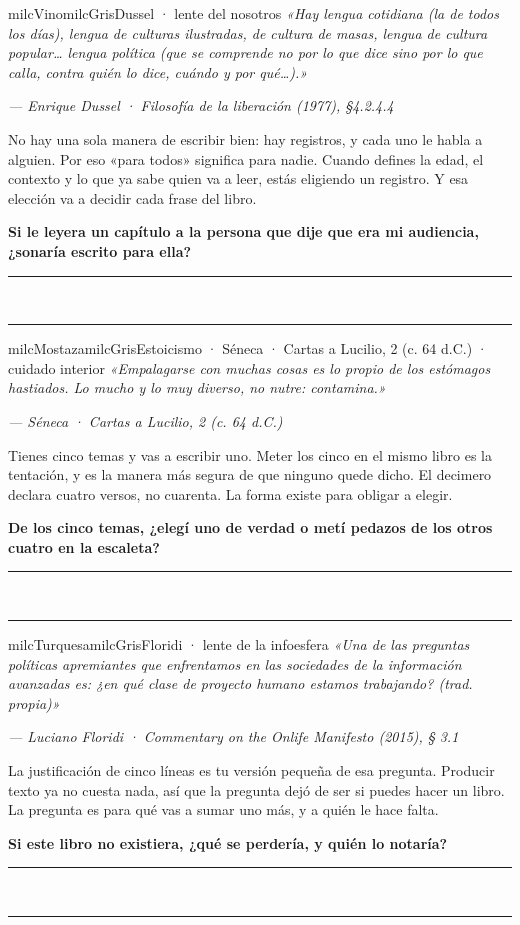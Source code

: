 \documentclass[11pt,letterpaper]{article}
\newcommand{\linead}[1]{\noindent\color{milcLinea}\rule{#1}{0.5pt}\color{milcNegro}}
\begin{document}
\begin{softbox}{milcVino}{milcGris}{Dussel · lente del nosotros}
\textit{«Hay lengua cotidiana (la de todos los días), lengua de culturas ilustradas, de cultura de masas, lengua de cultura popular… lengua política (que se comprende no por lo que dice sino por lo que calla, contra quién lo dice, cuándo y por qué…).»}

{\footnotesize\itshape\color{milcNegro!70}--- Enrique Dussel · Filosofía de la liberación (1977), §4.2.4.4}

No hay una sola manera de escribir bien: hay registros, y cada uno le habla a alguien. Por eso «para todos» significa para nadie. Cuando defines la edad, el contexto y lo que ya sabe quien va a leer, estás eligiendo un registro. Y esa elección va a decidir cada frase del libro.

\textbf{Si le leyera un capítulo a la persona que dije que era mi audiencia, ¿sonaría escrito para ella?}
\end{softbox}
\linead{\linewidth}\\[1mm]
\linead{\linewidth}

\begin{softbox}{milcMostaza}{milcGris}{Estoicismo · Séneca · Cartas a Lucilio, 2 (c. 64 d.C.) · cuidado interior}
\textit{«Empalagarse con muchas cosas es lo propio de los estómagos hastiados. Lo mucho y lo muy diverso, no nutre: contamina.»}

{\footnotesize\itshape\color{milcNegro!70}--- Séneca · Cartas a Lucilio, 2 (c. 64 d.C.)}

Tienes cinco temas y vas a escribir uno. Meter los cinco en el mismo libro es la tentación, y es la manera más segura de que ninguno quede dicho. El decimero declara cuatro versos, no cuarenta. La forma existe para obligar a elegir.

\textbf{De los cinco temas, ¿elegí uno de verdad o metí pedazos de los otros cuatro en la escaleta?}
\end{softbox}
\linead{\linewidth}\\[1mm]
\linead{\linewidth}

\begin{softbox}{milcTurquesa}{milcGris}{Floridi · lente de la infoesfera}
\textit{«Una de las preguntas políticas apremiantes que enfrentamos en las sociedades de la información avanzadas es: ¿en qué clase de proyecto humano estamos trabajando? (trad. propia)»}

{\footnotesize\itshape\color{milcNegro!70}--- Luciano Floridi · Commentary on the Onlife Manifesto (2015), § 3.1}

La justificación de cinco líneas es tu versión pequeña de esa pregunta. Producir texto ya no cuesta nada, así que la pregunta dejó de ser si puedes hacer un libro. La pregunta es para qué vas a sumar uno más, y a quién le hace falta.

\textbf{Si este libro no existiera, ¿qué se perdería, y quién lo notaría?}
\end{softbox}
\linead{\linewidth}\\[1mm]
\linead{\linewidth}
\end{document}
